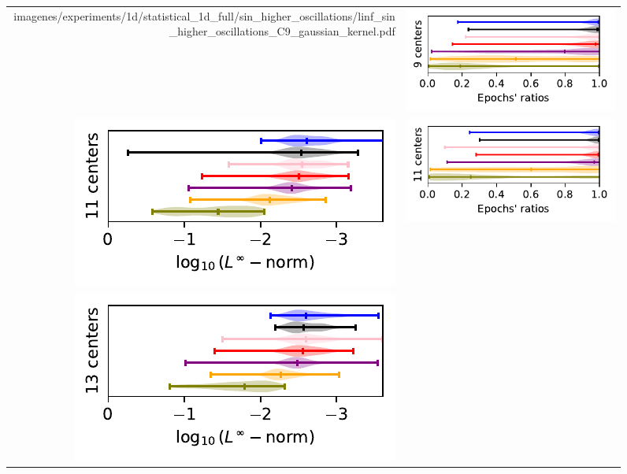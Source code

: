 \documentclass[12pt]{report} %
\begin{document}
\begin{figure}[H]
\begin{tabular}{rl}
{    {imagenes/experiments/1d/statistical_1d_full/sin_higher_oscillations/linf_sin_higher_oscillations_C9_gaussian_kernel.pdf}}  & 
    {\includegraphics[width=.44\textwidth, trim={.7cm 1.15cm 0 0},clip=true]
        {imagenes/experiments/1d/statistical_1d_full/sin_higher_oscillations/epochs_sin_higher_oscillations_C9_gaussian_kernel.pdf}}
    \\
    {\includegraphics[width=.5\textwidth, trim={0 1.25cm 0 0},clip=true]
    {imagenes/experiments/1d/statistical_1d_full/sin_higher_oscillations/linf_sin_higher_oscillations_C11_gaussian_kernel.pdf}} & 
    {\includegraphics[width=.44\textwidth, trim={.7cm 1.15cm 0 0},clip=true]
    {imagenes/experiments/1d/statistical_1d_full/sin_higher_oscillations/epochs_sin_higher_oscillations_C11_gaussian_kernel.pdf}}                                                                                     \\
    {\includegraphics[width=.5\textwidth, trim={0 1.25cm 0 0},clip=true]
    {imagenes/experiments/1d/statistical_1d_full/sin_higher_oscillations/linf_sin_higher_oscillations_C13_gaussian_kernel.pdf}} & 
    {\includegraphics[width=.44\textwidth, trim={.7cm 1.15cm 0 0},clip=true]
}
\end{tabular}
\end{figure}
\end{document}

